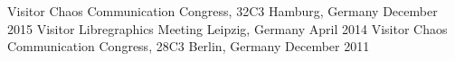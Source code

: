 \begin{cventries}
  \cventry
    {Visitor}
    {Chaos Communication Congress, 32C3}
    {Hamburg, Germany}
    {December 2015}
    {
    }
  \cventry
    {Visitor}
    {Libregraphics Meeting}
    {Leipzig, Germany}
    {April 2014}
    {
    }
  \cventry
    {Visitor}
    {Chaos Communication Congress, 28C3}
    {Berlin, Germany}
    {December 2011}
    {
    }
\end{cventries}
